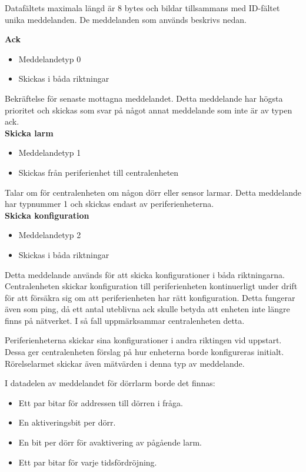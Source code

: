 Datafältets maximala längd är 8 bytes och bildar tillsammans med ID-fältet unika meddelanden. De meddelanden som används beskrivs nedan.



\textbf{Ack}
\begin{itemize}
    \item Meddelandetyp 0
    \item Skickas i båda riktningar
\end{itemize}
Bekräftelse för senaste mottagna meddelandet. Detta meddelande har högsta prioritet och skickas som svar på något annat meddelande som inte är av typen ack. \\


\textbf{Skicka larm}
\begin{itemize}
    \item Meddelandetyp 1
    \item Skickas från periferienhet till centralenheten
\end{itemize}
Talar om för centralenheten om någon dörr eller sensor larmar. Detta meddelande har typnummer 1 och skickas endast av periferienheterna. \\


\textbf{Skicka konfiguration}
\begin{itemize}
    \item Meddelandetyp 2
    \item Skickas i båda riktningar
\end{itemize}
Detta meddelande används för att skicka konfigurationer i båda riktningarna. Centralenheten skickar konfiguration till periferienheten kontinuerligt under drift för att försäkra sig om att periferienheten har rätt konfiguration. Detta fungerar även som ping, då ett antal uteblivna ack skulle betyda att enheten inte längre finns på nätverket. I så fall uppmärksammar centralenheten detta.

Periferienheterna skickar sina konfigurationer i andra riktingen vid uppstart. Dessa ger centralenheten förslag på hur enheterna borde konfigureras initialt. Rörelselarmet skickar även mätvärden i denna typ av meddelande.

I datadelen av meddelandet för dörrlarm borde det finnas:
\begin{itemize}
	\item Ett par bitar för addressen till dörren i fråga.
	\item En aktiveringsbit per dörr.
	\item En bit per dörr för avaktivering av pågående larm.
	\item Ett par bitar för varje tidsfördröjning.
\end{itemize}

